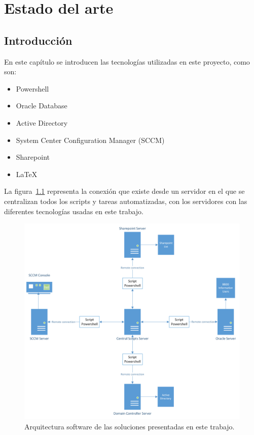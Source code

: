 \documentclass[a4paper, 12pt]{book}
\begin{document}
\cleardoublepage

\chapter{Estado del arte}
\label{chap:estado}

\section{Introducción}
\label{sec:Introducción}

En este capítulo se introducen las tecnologías utilizadas en este proyecto, como son:

\begin{itemize}
\item Powershell~\cite{lee2011windows}

\item Oracle Database~\cite{greenwald2013oracle}

\item Active Directory~\cite{desmond2008active}

\item System Center Configuration Manager (SCCM)~\cite{krstevski2014mastering}

\item Sharepoint~\cite{cawood2013microsoft}

\item \LaTeX~\cite{griffiths2016learning}
\end{itemize}

La figura~\ref{fig:Diagrama_tecnologias} representa la conexión que existe desde un servidor en el que se centralizan todos los scripts y tareas automatizadas, con los servidores con las diferentes tecnologías usadas en este trabajo.

\begin{figure}[h]
	\centering
	\includegraphics[width=17cm, keepaspectratio]{img/Diagrama_tecnologias.png}
	\caption{Arquitectura software de las soluciones presentadas en este trabajo.}
	\label{fig:Diagrama_tecnologias}
\end{figure}
\end{document}
